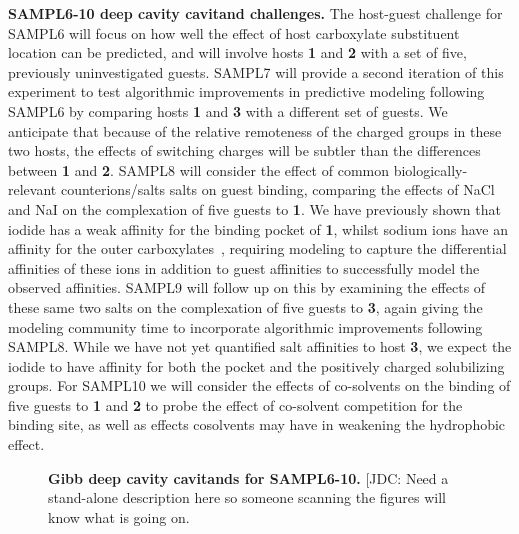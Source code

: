 \documentclass[11pt]{article}
\begin{document}
{\bf SAMPL6-10 deep cavity cavitand challenges.} 
The host-guest challenge for SAMPL6 will focus on how well the effect of host carboxylate substituent location can be predicted, and will involve hosts {\bf 1} and {\bf 2} with a set of five, previously uninvestigated guests.  
SAMPL7 will provide a second iteration of this experiment to test algorithmic improvements in predictive modeling following SAMPL6 by comparing hosts {\bf 1} and {\bf 3} with a different set of guests.  
We anticipate that because of the relative remoteness of the charged groups in these two hosts, the effects of switching charges will be subtler than the differences between {\bf 1} and {\bf 2}.  
SAMPL8 will consider the effect of common biologically-relevant counterions/salts salts on guest binding, comparing the effects of NaCl and NaI on the complexation of five guests to {\bf 1}.  
We have previously shown that iodide has a weak affinity for the binding pocket of {\bf 1}, whilst sodium ions have an affinity for the outer carboxylates~\cite{carnegie_anion_2014}, requiring modeling to capture the differential affinities of these ions in addition to guest affinities to successfully model the observed affinities.  
SAMPL9 will follow up on this by examining the effects of these same two salts on the complexation of five guests to {\bf 3}, again giving the modeling community time to incorporate algorithmic improvements following SAMPL8. 
While we have not yet quantified salt affinities to host {\bf 3}, we expect the iodide to have affinity for both the pocket and the positively charged solubilizing groups.  
For SAMPL10 we will consider the effects of co-solvents on the binding of five guests to {\bf 1} and {\bf 2} to probe the effect of co-solvent competition for the binding site, as well as effects cosolvents may have in weakening the hydrophobic effect. 

\begin{figure}[h]
\begin{centering}

\end{centering}

\vspace{0.1in}
\caption{\footnotesize {\bf Gibb deep cavity cavitands for SAMPL6-10.}
{\color{red}[JDC: Need a stand-alone description here so someone scanning the figures will know what is going on.}
\label{figure:gdccs}}
\end{figure}
\end{document}
